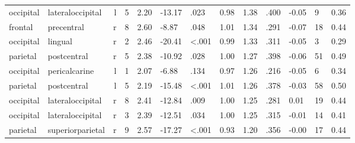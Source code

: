 \documentclass{article}
\begin{document}
\begin{longtable}{llrR{1.3cm}R{1cm}R{1.3cm}R{1cm}R{1cm}R{1.3cm}R{1cm}R{1.8cm}R{1.3cm}R{1.8cm}}
 occipital &          lateraloccipital &    l &         5 &                  2.20 &           -13.17 &               .023 &                               0.98 &                          1.38 &                            .400 &  -0.05 &      9 &      0.36 \\
   frontal &                precentral &    r &         8 &                  2.60 &            -8.87 &               .048 &                               1.01 &                          1.34 &                            .291 &  -0.07 &     18 &      0.44 \\
 occipital &                   lingual &    r &         2 &                  2.46 &           -20.41 &      \textless.001 &                               0.99 &                          1.33 &                            .311 &  -0.05 &      3 &      0.29 \\
  parietal &               postcentral &    r &         5 &                  2.38 &           -10.92 &               .028 &                               1.00 &                          1.27 &                            .398 &  -0.06 &     51 &      0.49 \\
 occipital &             pericalcarine &    l &         1 &                  2.07 &            -6.88 &               .134 &                               0.97 &                          1.26 &                            .216 &  -0.05 &      6 &      0.34 \\
  parietal &               postcentral &    l &         5 &                  2.19 &           -15.48 &      \textless.001 &                               1.01 &                          1.26 &                            .378 &  -0.03 &     58 &      0.50 \\
 occipital &          lateraloccipital &    r &         8 &                  2.41 &           -12.84 &               .009 &                               1.00 &                          1.25 &                            .281 &   0.01 &     19 &      0.44 \\
 occipital &          lateraloccipital &    r &         3 &                  2.39 &           -12.51 &               .034 &                               1.00 &                          1.25 &                            .315 &  -0.01 &     14 &      0.41 \\
  parietal &          superiorparietal &    r &         9 &                  2.57 &           -17.27 &      \textless.001 &                               0.93 &                          1.20 &                            .356 &  -0.00 &     17 &      0.44 \\

\end{longtable}
\end{document}
